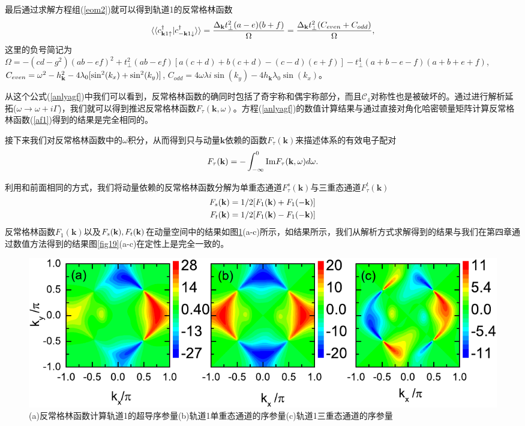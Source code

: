 最后通过求解方程组(\ref{eom2})就可以得到轨道1的反常格林函数
\begin{equation}
\langle\langle c_{{\bf k}1\uparrow}^\dagger|c_{-{\bf k}1\downarrow}^\dagger\rangle\rangle=\frac{\Delta_{\bf k} t_\perp ^2 (a-e) (b+f)}{\Omega}=\frac{\Delta_{\bf k}t_\perp^2(C_{even}+C_{odd})}{\Omega},\label{anlyagf}
\end{equation}
这里的负号简记为 $\Omega=-\left(c d-g^2\right) (a b-e f)^2+t_\perp ^2 (a b-e f) [a (c+d)+b (c+d)-(c-d) (e+f)]-t_\perp ^4 (a+b-e-f) (a+b+e+f)$, $C_{even}=\omega^2-h^2_{\bf{k}}-4\lambda_0[\sin^2(k_x)+\sin^2(k_y)]$, $C_{odd}=4\omega\lambda i\sin(k_y)-4h_{\mathbf{k}}\lambda_0\sin(k_x)$。

从这个公式(\ref{anlyagf})中我们可以看到，反常格林函数的确同时包括了奇宇称和偶宇称部分，而且$\mathcal{C}_4$对称性也是被破坏的。通过进行解析延拓($\omega\rightarrow\omega+i\Gamma$)，我们就可以得到推迟反常格林函数$F_\tau(\mathbf{k},\omega)$。方程(\ref{anlyagf})的数值计算结果与通过直接对角化哈密顿量矩阵计算反常格林函数(\ref{af1})得到的结果是完全相同的。

接下来我们对反常格林函数中的$\omega$积分，从而得到只与动量$\mathbf{k}$依赖的函数$F_\tau(\mathbf{k})$来描述体系的有效电子配对
\begin{equation}
F_\tau({\bf k})=-\int_{-\infty}^0\mathrm{Im}F_\tau({\bf k},\omega)d\omega.
\end{equation}

利用和前面相同的方式，我们将动量依赖的反常格林函数分解为单重态通道$F^s_\tau(\mathbf{k})$与三重态通道$F^t_\tau(\mathbf{k})$
\begin{equation}
\begin{aligned}
F_s({\bf k})&=1/2[F_1({\bf k})+F_1(-{\bf k})]\\
F_t({\bf k})&=1/2[F_1({\bf k})-F_1(-{\bf k})]
\end{aligned}
\end{equation}
反常格林函数$F_1(\mathbf{k})$以及$F_s({\bf k}),F_t({\bf k})$在动量空间中的结果如图\ref{fig21}(a-c)所示，如结果所示，我们从解析方式求解得到的结果与我们在第四章通过数值方法得到的结果图\ref{fig19}(a-c)在定性上是完全一致的。
\begin{figure}[h]
\centering
\includegraphics[scale=0.8]{pic/fig22}
\caption{(a)反常格林函数计算轨道1的超导序参量(b)轨道1单重态通道的序参量(c)轨道1三重态通道的序参量}\label{fig21}
\end{figure}
